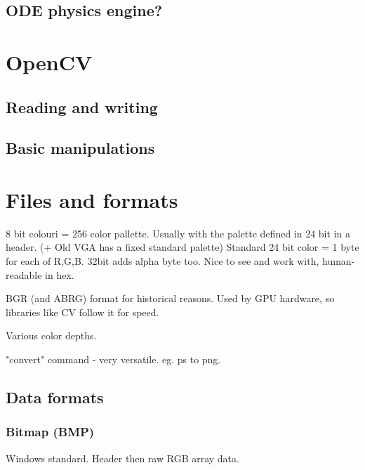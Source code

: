 \documentclass[oneside,english]{scrbook}
\begin{document}
\section{ODE physics engine?}

\chapter{OpenCV}


\section{Reading and writing}




\section{Basic manipulations}


\chapter{Files and formats}

8 bit colouri = 256 color pallette. Usually with the palette defined in 24 bit in a header. (+ Old VGA has a fixed standard palette)
Standard 24 bit color = 1 byte for each of R,G,B. 32bit adds alpha byte too.  Nice to see and work with, human-readable in hex.

BGR (and ABRG) format for historical reasons. Used by GPU hardware, so libraries like CV follow it for speed.

Various color depths.

"convert" command - very versatile. eg. ps to png.


\section{Data formats}



\subsection{Bitmap (BMP)}

Windows standard. Header then raw RGB array data.
\end{document}
